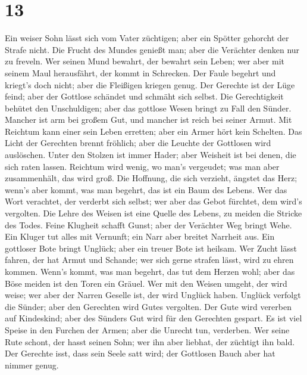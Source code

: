 \hypertarget{section-12}{%
\section{13}\label{section-12}}

 Ein weiser Sohn lässt sich vom Vater züchtigen; aber ein
Spötter gehorcht der Strafe nicht.  Die Frucht des Mundes
genießt man; aber die Verächter denken nur zu freveln. 
Wer seinen Mund bewahrt, der bewahrt sein Leben; wer aber mit seinem
Maul herausfährt, der kommt in Schrecken.  Der Faule
begehrt und kriegt's doch nicht; aber die Fleißigen kriegen genug.
 Der Gerechte ist der Lüge feind; aber der Gottlose
schändet und schmäht sich selbst.  Die Gerechtigkeit
behütet den Unschuldigen; aber das gottlose Wesen bringt zu Fall den
Sünder.  Mancher ist arm bei großem Gut, und mancher ist
reich bei seiner Armut.  Mit Reichtum kann einer sein
Leben erretten; aber ein Armer hört kein Schelten.  Das
Licht der Gerechten brennt fröhlich; aber die Leuchte der Gottlosen wird
auslöschen.  Unter den Stolzen ist immer Hader; aber
Weisheit ist bei denen, die sich raten lassen.  Reichtum
wird wenig, wo man's vergeudet; was man aber zusammenhält, das wird
groß.  Die Hoffnung, die sich verzieht, ängstet das Herz;
wenn's aber kommt, was man begehrt, das ist ein Baum des Lebens.
 Wer das Wort verachtet, der verderbt sich selbst; wer
aber das Gebot fürchtet, dem wird's vergolten.  Die Lehre
des Weisen ist eine Quelle des Lebens, zu meiden die Stricke des Todes.
 Feine Klugheit schafft Gunst; aber der Verächter Weg
bringt Wehe.  Ein Kluger tut alles mit Vernunft; ein Narr
aber breitet Narrheit aus.  Ein gottloser Bote bringt
Unglück; aber ein treuer Bote ist heilsam.  Wer Zucht
lässt fahren, der hat Armut und Schande; wer sich gerne strafen lässt,
wird zu ehren kommen.  Wenn's kommt, was man begehrt, das
tut dem Herzen wohl; aber das Böse meiden ist den Toren ein Gräuel.
 Wer mit den Weisen umgeht, der wird weise; wer aber der
Narren Geselle ist, der wird Unglück haben.  Unglück
verfolgt die Sünder; aber den Gerechten wird Gutes vergolten.
 Der Gute wird vererben auf Kindeskind; aber des Sünders
Gut wird für den Gerechten gespart.  Es ist viel Speise
in den Furchen der Armen; aber die Unrecht tun, verderben.
 Wer seine Rute schont, der hasst seinen Sohn; wer ihn
aber liebhat, der züchtigt ihn bald.  Der Gerechte isst,
dass sein Seele satt wird; der Gottlosen Bauch aber hat nimmer genug.

